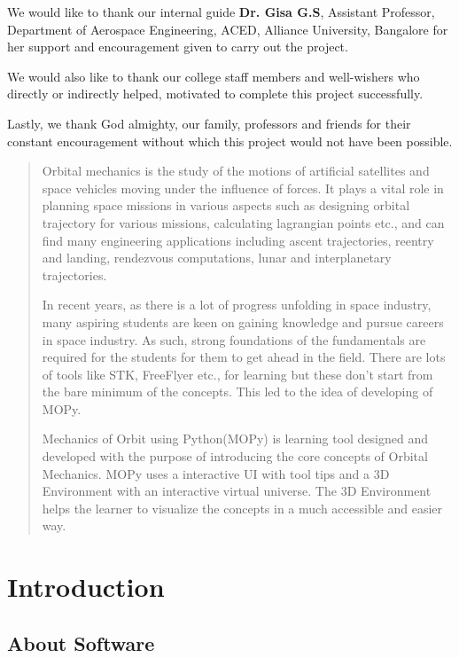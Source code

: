 \documentclass[12pt]{article}
\begin{document}
We would like to thank our internal guide \textbf{Dr. Gisa G.S}, Assistant Professor, Department of Aerospace Engineering, ACED, Alliance University, Bangalore for her support and encouragement given to carry out the project. \par

We would also like to thank our college staff members and well-wishers who directly or indirectly helped, motivated to complete this project successfully. \par

Lastly, we thank God almighty, our family, professors and friends for their constant encouragement without which this project would not have been possible.\\
\thispagestyle{empty}
\newpage

\begin{abstract}
Orbital mechanics is the study of the motions of artificial satellites and space vehicles moving under the influence of forces. It plays a vital role in planning space missions in various aspects such as designing orbital trajectory for various missions, calculating lagrangian points etc., and can find many engineering applications  including ascent trajectories, reentry and landing, rendezvous computations, lunar and interplanetary trajectories. 

In recent years, as there is a lot of progress unfolding in space industry, many aspiring students are keen on gaining knowledge and pursue careers in space industry. As such, strong foundations of the fundamentals are required for the students for them to get ahead in the field. There are lots of tools like STK, FreeFlyer etc., for learning but these don't start from the bare minimum of the concepts. This led to the idea of developing of MOPy.

Mechanics of Orbit using Python(MOPy) is learning tool designed and developed with the purpose of introducing the core concepts of Orbital Mechanics. MOPy uses a interactive UI with tool tips and a 3D Environment with an interactive virtual universe. The 3D Environment helps the learner to visualize the concepts in a much accessible and easier way.
\end{abstract}

\thispagestyle{empty}
\newpage
\clearpage
\setcounter{page}{1}
\section{Introduction}
\subsection{About Software}
\end{document}
